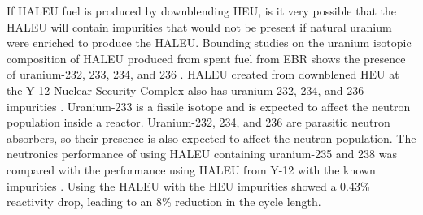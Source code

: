 If \gls{HALEU} fuel is produced by downblending \gls{HEU}, is it very possible that 
the \gls{HALEU} will contain impurities that would not be present if natural uranium 
were enriched to produce the \gls{HALEU}. Bounding studies on the uranium isotopic 
composition of \gls{HALEU} produced from spent fuel from \gls{EBR} shows the presence 
of uranium-232, 233, 234, and 236 \cite{vaden_isotopic_2018}. \gls{HALEU} created from 
downblened \gls{HEU} at the Y-12 Nuclear Security Complex also has uranium-232, 234, and 
236 impurities \cite{nelson_foreign_2010}. Uranium-233 is a fissile 
isotope and is expected to affect the neutron population inside a reactor. Uranium-232, 
234, and 236 are parasitic neutron absorbers, so their presence is also expected to affect 
the neutron population. The neutronics performance of using \gls{HALEU} containing
uranium-235 and 238 was compared with the performance using \gls{HALEU} from Y-12 with the 
known impurities \cite{celikten_effects_2021}. Using 
the \gls{HALEU} with the \gls{HEU} impurities showed a 0.43\% reactivity drop, leading to 
an 8\% reduction in the cycle length. 
